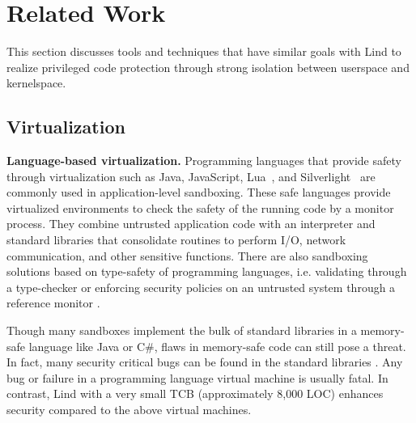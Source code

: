 \section{Related Work}
\label{sec.related_work}

This section discusses tools and techniques that have similar goals
with Lind to realize privileged code protection through strong
isolation between userspace and kernelspace.
	
\subsection{Virtualization}

\textbf{Language-based virtualization.}
Programming languages that provide safety through virtualization such
as Java, JavaScript, Lua~\cite{Lua}, and
Silverlight~\cite{Silverlight} are commonly used in application-level
sandboxing. These safe languages provide virtualized environments to
check the safety of the running code by a monitor process. They
combine untrusted application code with an interpreter and
standard libraries that consolidate routines to perform I/O, network
communication, and other sensitive functions. 
%
There are also sandboxing solutions based on type-safety of programming
languages, i.e. validating through a type-checker \cite{JS-Sandboxing}
or enforcing security policies on an untrusted system through a
reference monitor \cite{JS-Sandboxing1}. %


Though many sandboxes implement the bulk of standard libraries in a
memory-safe language like Java or C\#, flaws in memory-safe code can
still pose a threat. In fact, many security critical bugs can be found
in the standard libraries \cite{JavaBugs, Java-Lessons}. 
Any bug or failure in a programming language virtual
machine is usually fatal. In contrast, Lind with a very small TCB (approximately
8,000 LOC) enhances security compared to the above virtual machines.

